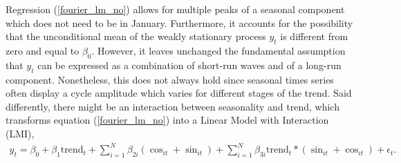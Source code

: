 \documentclass{article}\usepackage[]{graphicx}\usepackage[]{color}
\begin{document}
Regression (\ref{fourier_lm_no}) allows for multiple peaks of a seasonal component which does not need to be in January. Furthermore, it accounts for the possibility that the unconditional mean of the weakly stationary process $y_{t}$ is different from zero and equal to $\beta_{0}$. However, it leaves unchanged the fundamental assumption that $ y_{t} $ can be expressed as a combination of short-run waves and of a long-run component. Nonetheless, this does not always hold since seasonal times series often display a cycle amplitude which varies for different stages of the trend. Said differently, there might be an interaction between seasonality and trend, which transforms equation (\ref{fourier_lm_no}) into a Linear Model with Interaction (LMI),
\begin{align}\label{fourier_lm_int}
y_{t}=\beta_{0}+\beta_{1}\text{trend}_{t}+\sum_{i=1}^{N}\beta_{2i}(\cos_{it}+\sin_{it})+\sum_{i=1}^{N}\beta_{3i}\text{trend}_{t}*(\sin_{it}+\cos_{it})+\epsilon_{t}.
\end{align}
\end{document}
